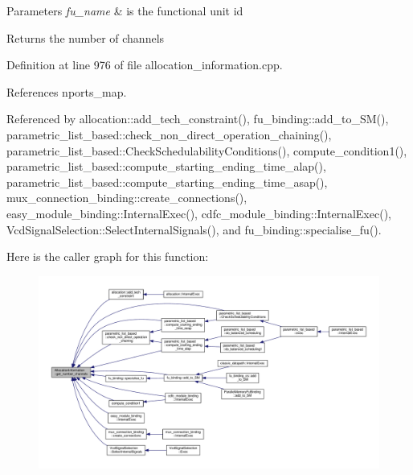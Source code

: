 \begin{DoxyParams}{Parameters}
{\em fu\+\_\+name} & is the functional unit id \\
\hline
\end{DoxyParams}
\begin{DoxyReturn}{Returns}
the number of channels 
\end{DoxyReturn}


Definition at line 976 of file allocation\+\_\+information.\+cpp.



References nports\+\_\+map.



Referenced by allocation\+::add\+\_\+tech\+\_\+constraint(), fu\+\_\+binding\+::add\+\_\+to\+\_\+\+S\+M(), parametric\+\_\+list\+\_\+based\+::check\+\_\+non\+\_\+direct\+\_\+operation\+\_\+chaining(), parametric\+\_\+list\+\_\+based\+::\+Check\+Schedulability\+Conditions(), compute\+\_\+condition1(), parametric\+\_\+list\+\_\+based\+::compute\+\_\+starting\+\_\+ending\+\_\+time\+\_\+alap(), parametric\+\_\+list\+\_\+based\+::compute\+\_\+starting\+\_\+ending\+\_\+time\+\_\+asap(), mux\+\_\+connection\+\_\+binding\+::create\+\_\+connections(), easy\+\_\+module\+\_\+binding\+::\+Internal\+Exec(), cdfc\+\_\+module\+\_\+binding\+::\+Internal\+Exec(), Vcd\+Signal\+Selection\+::\+Select\+Internal\+Signals(), and fu\+\_\+binding\+::specialise\+\_\+fu().

Here is the caller graph for this function\+:
\nopagebreak
\begin{figure}[H]
\begin{center}
\leavevmode
\includegraphics[width=350pt]{d7/d79/classAllocationInformation_af0d620492405831a57abd8dc83eac3fc_icgraph}
\end{center}
\end{figure}
\mbox{\label{classAllocationInformation_a2a8c7fa5894b079fb5f2d76bf32fc9ef}} 
